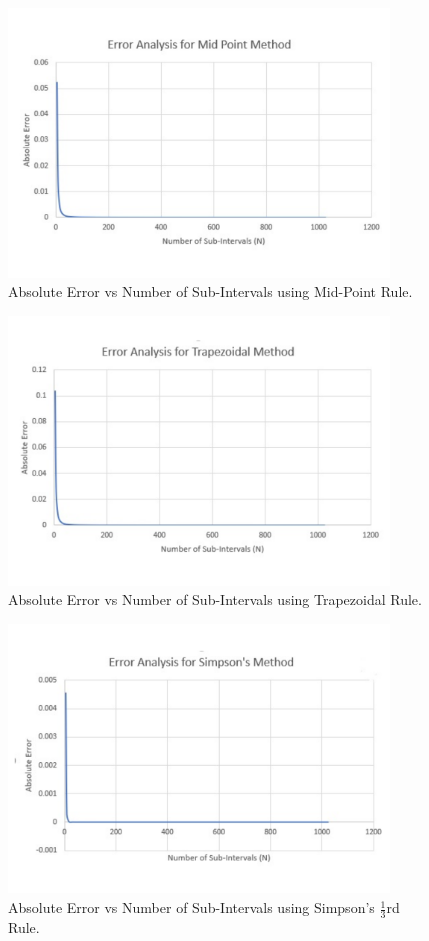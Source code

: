 \documentclass[titlepage, 11pt]{article}
\begin{document}
\begin{figure}[!tbh]
  	\centering
  	\includegraphics[width=0.9\textwidth]{MP1.pdf} 
  	\caption{Absolute Error vs Number of Sub-Intervals using Mid-Point Rule.}
  	\label{fig:q1a} 
\end{figure}
\begin{figure}[!tbh]
  	\centering
  	\includegraphics[width=0.9\textwidth]{TP1.pdf} 
  	\caption{Absolute Error vs Number of Sub-Intervals using Trapezoidal Rule.}
  	\label{fig:q1b} 
\end{figure}
\begin{figure}[!tbh]
  	\centering
  	\includegraphics[width=0.9\textwidth]{SR1.pdf} 
  	\caption{Absolute Error vs Number of Sub-Intervals using Simpson's $\frac{1}{3}$rd Rule.}
  	\label{fig:q1c} 
\end{figure}
\end{document}
